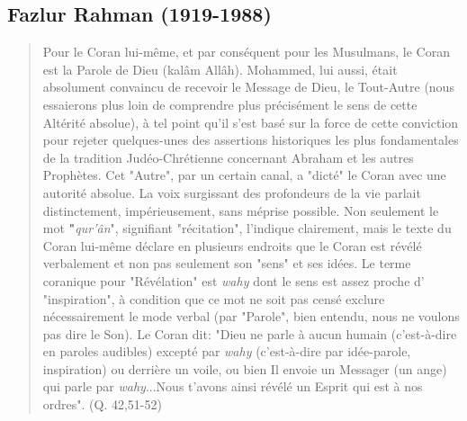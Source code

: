 \hypertarget{fazlur-rahman-1919-1988}{%
\subsection{\texorpdfstring{{Fazlur Rahman
(1919-1988)}}{Fazlur Rahman (1919-1988)}}\label{fazlur-rahman-1919-1988}}

\begin{quote}
Pour le Coran lui-même, et par conséquent pour les Musulmans, le Coran
est la Parole de Dieu (kalâm Allâh). Mohammed, lui aussi, était
absolument convaincu de recevoir le Message de Dieu, le Tout-Autre (nous
essaierons plus loin de comprendre plus précisément le sens de cette
Altérité absolue), à tel point qu'il s'est basé sur la force de cette
conviction pour rejeter quelques-unes des assertions historiques les
plus fondamentales de la tradition Judéo-Chrétienne concernant Abraham
et les autres Prophètes. Cet "Autre", par un certain canal, a "dicté" le
Coran avec une autorité absolue. La voix surgissant des profondeurs de
la vie parlait distinctement, impérieusement, sans méprise possible. Non
seulement le mot \textbf{"}\emph{qur'ân}", signifiant "récitation",
l'indique clairement, mais le texte du Coran lui-même déclare en
plusieurs endroits que le Coran est révélé verbalement et non pas
seulement son "sens" et ses idées. Le terme coranique pour "Révélation"
est \emph{wahy} dont le sens est assez proche d' "inspiration", à
condition que ce mot ne soit pas censé exclure nécessairement le mode
verbal (par "Parole", bien entendu, nous ne voulons pas dire le Son). Le
Coran dit: "Dieu ne parle à aucun humain (c'est-à-dire en paroles
audibles) excepté par \emph{wahy} (c'est-à-dire par idée-parole,
inspiration) ou derrière un voile, ou bien Il envoie un Messager (un
ange) qui parle par \emph{wahy}...Nous t'avons ainsi révélé un Esprit
qui est à nos ordres". (Q. 42,51-52)


\end{quote}
